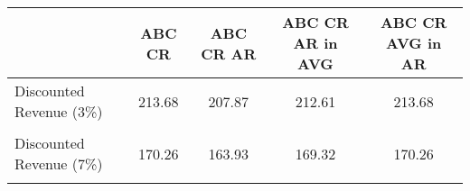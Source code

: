 \begin{tabular}{l*{4}{c}}
\hline\hline
                &   ABC CR&ABC CR AR&ABC CR AR in AVG&ABC CR AVG in AR\\
\hline
Discounted Revenue (3\%)&   213.68&   207.87&   212.61&   213.68\\
                &         &         &         &         \\
Discounted Revenue (7\%)&   170.26&   163.93&   169.32&   170.26\\
                &         &         &         &         \\
\hline\hline
\end{tabular}
